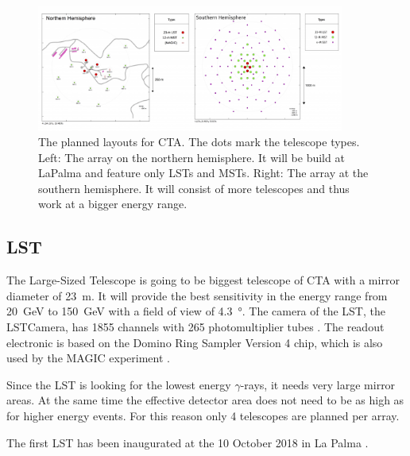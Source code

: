 \begin{figure}
	\center
	\captionsetup{width=0.9\linewidth}
	\includegraphics[width=0.9\textwidth]{images/cta_layout.png}
	\caption{The planned layouts for CTA. The dots mark the telescope types.
	Left: The array on the northern hemisphere. It will be build at LaPalma
	and feature only LSTs and MSTs.
	Right: The array at the southern hemisphere.
	It will consist of more telescopes and thus 
	work at a bigger energy range.
	\cite{cta_web}}
	\label{fig:cta_layout}
\end{figure}


\subsection{LST}
\label{sec:lst}

The Large-Sized Telescope is going to be biggest telescope of CTA
with a mirror diameter of \SI{23}{\meter}.
It will provide the best sensitivity in the energy range from 
\SI{20}{\giga\electronvolt} to \SI{150}{\giga\electronvolt} with a field of view of \SI{4.3}{\degree}.
The camera of the LST, the LSTCamera, has \num{1855} channels 
with \num{265} photomultiplier tubes \cite{cta_web}.
The readout electronic is based on the Domino Ring Sampler 
Version 4 chip, which is also used by the MAGIC experiment
\cite{Kubo:2013pwa}. 

Since the LST is looking for the lowest energy $\gamma$-rays, it needs
very large mirror areas. At the same time the effective detector area does 
not need to be as high as for higher energy events.
For this reason only 4 telescopes are planned per array.

The first LST has been inaugurated at the 10 October 2018 in La Palma \cite{lst_debut}.

